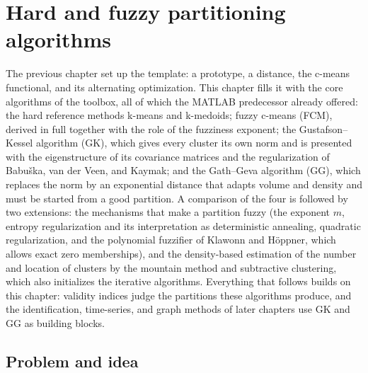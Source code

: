 \chapter[Partitioning algorithms]{Hard and fuzzy partitioning algorithms}\label{ch:partitioning}
\begin{roadmap}
The previous chapter set up the template: a prototype, a distance, the c-means functional, and its alternating optimization. This chapter fills it with the core algorithms of the toolbox, all of which the MATLAB predecessor already offered: the hard reference methods k-means and k-medoids; fuzzy c-means (FCM), derived in full together with the role of the fuzziness exponent; the Gustafson--Kessel algorithm (GK), which gives every cluster its own norm and is presented with the eigenstructure of its covariance matrices and the regularization of Babu\v{s}ka, van der Veen, and Kaymak; and the Gath--Geva algorithm (GG), which replaces the norm by an exponential distance that adapts volume and density and must be started from a good partition. A comparison of the four is followed by two extensions: the mechanisms that make a partition fuzzy (the exponent $m$, entropy regularization and its interpretation as deterministic annealing, quadratic regularization, and the polynomial fuzzifier of Klawonn and H\"oppner, which allows exact zero memberships), and the density-based estimation of the number and location of clusters by the mountain method and subtractive clustering, which also initializes the iterative algorithms. Everything that follows builds on this chapter: validity indices judge the partitions these algorithms produce, and the identification, time-series, and graph methods of later chapters use GK and GG as building blocks.
\end{roadmap}

\section{Problem and idea}\label{sec:part:problem}

